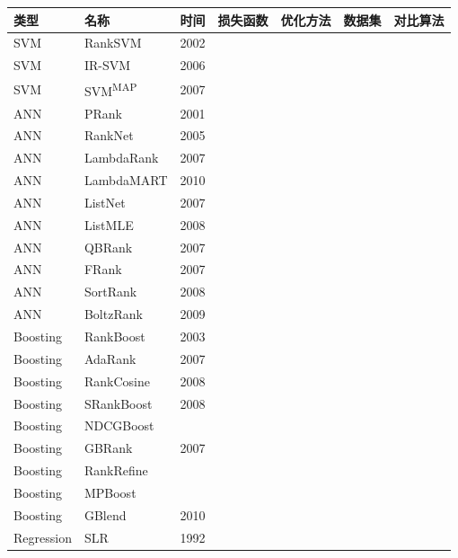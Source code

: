 \begin{table}[ht]
\centering
    \begin{tabular}{|l|l|l|l|l|l|l|}
      \hline
      类型 & 名称 & 时间 & 损失函数 & 优化方法 & 数据集 & 对比算法\\
      \hline
      SVM & RankSVM\cite{joachims2002optimizing} &2002 & & & &\\
      SVM & IR-SVM\cite{cao2006adapting} & 2006& & & &\\
      SVM & SVM\textsuperscript{MAP}\cite{yue2007support} &2007 & & & &\\
      \hline
      ANN & PRank\cite{crammer2001pranking} & 2001 & & & &\\
      ANN & RankNet\cite{burges2005learning} & 2005 & & & &\\
      ANN & LambdaRank\cite{burges2007learning} & 2007 & & & &\\
      ANN & LambdaMART\cite{burges2010from} & 2010 & & & &\\
      ANN & ListNet\cite{cao2007learning} & 2007 & & & &\\
      ANN & ListMLE\cite{xia2008listwise} & 2008 & & & &\\
      ANN & QBRank\cite{zheng2007general}& 2007 & & & &\\
      ANN & FRank\cite{tsai2007frank}& 2007 & & & &\\
      ANN & SortRank\cite{rigutini2008sortnet}& 2008 & & & &\\
      ANN & BoltzRank\cite{volkovs2009boltzrank}& 2009 & & & &\\
      \hline
      Boosting & RankBoost\cite{freund2003efficient} & 2003& & & &\\
      Boosting & AdaRank\cite{xu2007adarank} & 2007& & & &\\
      Boosting & RankCosine\cite{qin2008query} & 2008& & & &\\
      Boosting & SRankBoost\cite{amini2008boosting} & 2008 & & & &\\
      Boosting & NDCGBoost\cite{valizadegan2009learning} & & & & &\\
      Boosting & GBRank\cite{zheng2007regression} & 2007 & & & &\\
      Boosting & RankRefine\cite{jin2008ranking} & & & & &\\
      Boosting & MPBoost\cite{zhu2009general} & & & & &\\
      Boosting & GBlend\cite{chen2010learning}& 2010 & & & &\\
      \hline
      Regression & SLR\cite{cooper1992probabilistic} & 1992 & & & &\\

\end{tabular}
\end{table}
